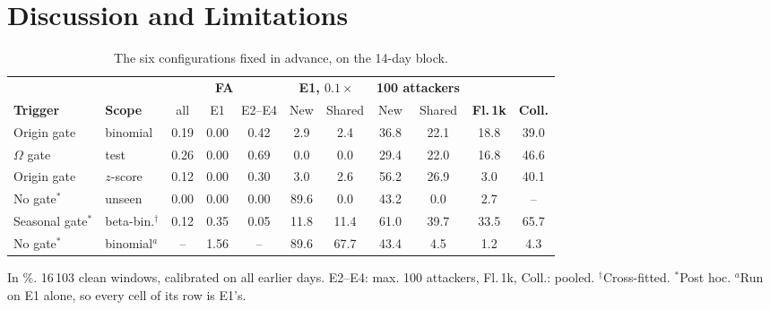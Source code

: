 \documentclass[conference,letterpaper,10pt]{IEEEtran}
\newcommand\1{\textit{(i)}}
\newcommand\2{\textit{(ii)}}
\newcommand\3{\textit{(iii)}}
\newcommand\4{\textit{(iv)}}
\newcommand\5{\textit{(v)}}
\newcommand\6{\textit{(vi)}}
\newcommand\7{\textit{(vii)}}
\newcommand\8{\textit{(viii)}}
\newcommand\9{\textit{(ix)}}
\begin{document}
\section{Discussion and Limitations}
\label{sec:discussion}

\begin{table}[t]
\centering
\caption{The six configurations fixed in advance, on the 14-day block.}
\label{tab:block}
\scriptsize
\setlength{\tabcolsep}{1.8pt}
\begin{tabular}{@{}llccccccccc@{}}
\toprule
 & & \multicolumn{3}{c}{\textbf{FA}} & \multicolumn{2}{c}{\textbf{E1, $0.1\times$}} & \multicolumn{2}{c}{\textbf{100 attackers}} & & \\
\cmidrule(lr){3-5}\cmidrule(lr){6-7}\cmidrule(lr){8-9}
\textbf{Trigger} & \textbf{Scope} & all & E1 & E2--E4 & New & Shared & New & Shared & \textbf{Fl.\,1k} & \textbf{Coll.} \\
\midrule
Origin gate   & binomial              & 0.19 & 0.00 & 0.42 & 2.9  & 2.4  & 36.8 & 22.1 & 18.8 & 39.0 \\
$\Omega$ gate & test                  & 0.26 & 0.00 & 0.69 & 0.0  & 0.0  & 29.4 & 22.0 & 16.8 & 46.6 \\
Origin gate   & $z$-score             & 0.12 & 0.00 & 0.30 & 3.0  & 2.6  & 56.2 & 26.9 & 3.0  & 40.1 \\
No gate$^{*}$ & unseen                & 0.00 & 0.00 & 0.00 & 89.6 & 0.0  & 43.2 & 0.0  & 2.7  & --   \\
Seasonal gate$^{*}$ & beta-bin.$^{\dagger}$ & 0.12 & 0.35 & 0.05 & 11.8 & 11.4 & 61.0 & 39.7 & 33.5 & 65.7 \\
No gate$^{*}$ & binomial$^{a}$        & --   & 1.56 & --   & 89.6 & 67.7 & 43.4 & 4.5  & 1.2  & 4.3  \\
\bottomrule
\end{tabular}

\vspace{2pt}
{\footnotesize In \%. 16\,103 clean windows, calibrated on all earlier days. E2--E4: max. 100 attackers, Fl.\,1k, Coll.: pooled. $^{\dagger}$Cross-fitted. $^{*}$Post hoc. $^{a}$Run on E1 alone, so every cell of its row is E1's.}
\end{table}
\end{document}
